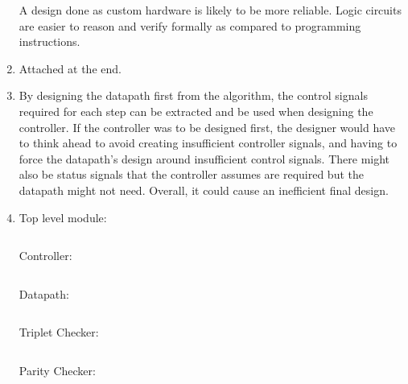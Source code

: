 \documentclass{article}
\begin{document}
\begin{enumerate}
        A design done as custom hardware is likely to be more reliable. Logic circuits are easier to reason and verify formally as compared to programming instructions.

  \item Attached at the end.

  \item By designing the datapath first from the algorithm, the control signals required for each step can be extracted and be used when designing the controller. If the controller was to be designed first, the designer would have to think ahead to avoid creating insufficient controller signals, and having to force the datapath's design around insufficient control signals. There might also be status signals that the controller assumes are required but the datapath might not need. Overall, it could cause an inefficient final design.

  \item
        Top level module:
        \inputminted{vhdl}{src/VectorCounter.vhd}

        Controller:
        \inputminted{vhdl}{src/VectorCounterController.vhd}

        Datapath:
        \inputminted{vhdl}{src/VectorCounterDatapath.vhd}

        Triplet Checker:
        \inputminted{vhdl}{src/TripletChecker.vhd}

        Parity Checker:
        \inputminted{vhdl}{src/ParityChecker.vhd}
\end{enumerate}


\end{document}
